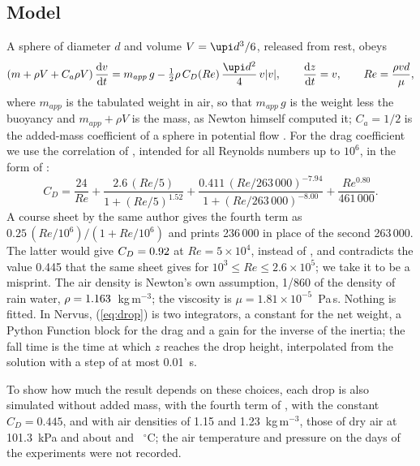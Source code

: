 \documentclass{jfm}
\begin{document}
\subsection{Model}

A sphere of diameter $d$ and volume $V = \upi d^3/6$, released from rest, obeys
\begin{equation}
  \left(m + \rho V + C_a \rho V\right) \frac{\mathrm{d}v}{\mathrm{d}t} = m_{app}\, g
  - \tfrac{1}{2}\rho\, C_D(Re)\, \frac{\upi d^2}{4}\, v|v|, \qquad
  \frac{\mathrm{d}z}{\mathrm{d}t} = v, \qquad Re = \frac{\rho v d}{\mu},
  \label{eq:drop}
\end{equation}
where $m_{app}$ is the tabulated weight in air, so that $m_{app}\,g$ is the weight less the buoyancy and
$m_{app} + \rho V$ is the mass, as Newton himself computed it; $C_a = 1/2$ is the added-mass coefficient of a
sphere in potential flow \citep{Batchelor1967}. For the drag coefficient we use the correlation of
\citet{Morrison2013}, intended for all Reynolds numbers up to $10^6$, in the form of \citet{Morrison2013handout}:
\begin{equation}
  C_D = \frac{24}{Re} + \frac{2.6\,(Re/5)}{1 + (Re/5)^{1.52}}
  + \frac{0.411\,(Re/263\,000)^{-7.94}}{1 + (Re/263\,000)^{-8.00}}
  + \frac{Re^{0.80}}{461\,000} .
  \label{eq:cd}
\end{equation}
A course sheet by the same author \citep{Morrison2013sheet} gives the fourth term as $0.25\,(Re/10^6)/(1+Re/10^6)$
and prints 236\,000 in place of the second 263\,000. The latter would give $C_D = 0.92$ at
$Re = 5\times10^4$, instead of \CdHandoutFiftyK, and contradicts the value 0.445 that the same sheet gives for
$10^3 \le Re \le 2.6\times10^5$; we take it to be a misprint.
The air density is Newton's own assumption, 1/860 of the density of rain water, $\rho = 1.163$~kg\,m$^{-3}$; the
viscosity is $\mu = 1.81\times10^{-5}$~Pa\,s. Nothing is fitted. In Nervus, (\ref{eq:drop}) is two integrators,
a constant for the net weight, a Python Function block for the drag and a gain for the inverse of the inertia;
the fall time is the time at which $z$ reaches the drop height, interpolated from the solution with a step of at
most 0.01~s.

To show how much the result depends on these choices, each drop is also simulated without added mass, with the
fourth term of \citet{Morrison2013sheet}, with the constant $C_D = 0.445$, and with air densities of 1.15 and
1.23~kg\,m$^{-3}$, those of dry air at 101.3~kPa and about \RhoTempHigh{} and \RhoTempLow~$^\circ$C; the air
temperature and pressure on the days of the experiments were not recorded.
\end{document}
